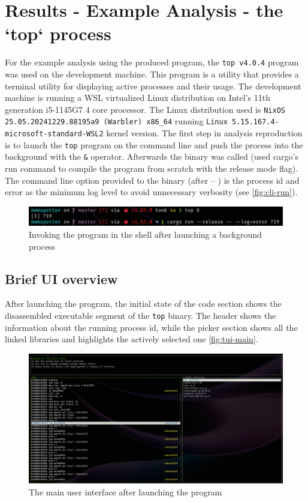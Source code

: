 \chapter{Results - Example Analysis - the `top` process}
\label{cha:results}

For the example analysis using the produced program, the \verb|top v4.0.4| \cite{warner_procps-ng_2023} program was used on the development machine.
This program is a utility that provides a terminal utility for displaying active processes and their usage.
The development machine is running a WSL virtualized Linux distribution on Intel's 11th generation i5-1145G7 4 core processor.
The Linux distribution used is \verb|NixOS 25.05.20241229.88195a9 (Warbler) x86_64| running \verb|Linux 5.15.167.4-microsoft-standard-WSL2| kernel version.
The first step in analysis reproduction is to launch the \verb|top| program on the command line and push the process into the background with the \verb|&| operator.
Afterwards the binary was called (used cargo's run command to compile the program from scratch with the release mode flag). The command line option provided to the binary (after -- ) is the process id and error as the minimum log level to avoid unnecessary verbosity (see \autoref{fig:cli-run}).

\begin{figure}
    \centering
    \includegraphics[width=1\linewidth]{cli-run.png}
    \caption{Invoking the program in the shell after launching a background process}
    \label{fig:cli-run}
\end{figure}

\section{Brief UI overview}

After launching the program, the initial state of the code section shows the disassembled executable segment of the \verb|top| binary.
The header shows the information about the running process id, while the picker section shows all the linked libraries and highlights the actively selected one \autoref{fig:tui-main}.

\begin{figure}
    \centering
    \includegraphics[width=1\linewidth]{tui-main.png}
    \caption{The main user interface after launching the program}
    \label{fig:tui-main}
\end{figure}


